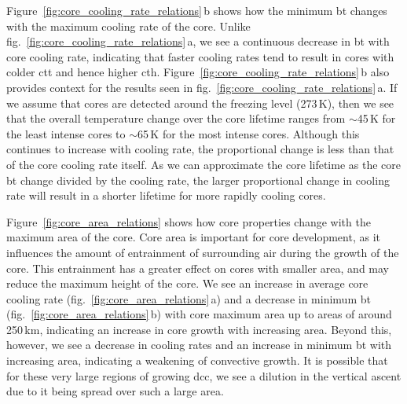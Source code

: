Figure~\ref{fig:core_cooling_rate_relations}\,b shows how the minimum \acrshort{bt} changes with the maximum cooling rate of the core.
Unlike fig.~\ref{fig:core_cooling_rate_relations}\,a, we see a continuous decrease in \acrshort{bt} with core cooling rate, indicating that faster cooling rates tend to result in cores with colder \acrshort{ctt} and hence higher \acrshort{cth}.
Figure~\ref{fig:core_cooling_rate_relations}\,b also provides context for the results seen in fig.~\ref{fig:core_cooling_rate_relations}\,a.
If we assume that cores are detected around the freezing level (273\,\unit{K}), then we see that the overall temperature change over the core lifetime ranges from $\sim$45\,\unit{K} for the least intense cores to $\sim$65\,\unit{K} for the most intense cores.
Although this continues to increase with cooling rate, the proportional change is less than that of the core cooling rate itself.
As we can approximate the core lifetime as the core \acrshort{bt} change divided by the cooling rate, the larger proportional change in cooling rate will result in a shorter lifetime for more rapidly cooling cores.


Figure~\ref{fig:core_area_relations} shows how core properties change with the maximum area of the core.
Core area is important for core development, as it influences the amount of entrainment of surrounding air during the growth of the core.
This entrainment has a greater effect on cores with smaller area, and may reduce the maximum height of the core.
We see an increase in average core cooling rate (fig.~\ref{fig:core_area_relations}\,a) and a decrease in minimum \acrshort{bt} (fig.~\ref{fig:core_area_relations}\,b) with core maximum area up to areas of around 250\,\unit{km}, indicating an increase in core growth with increasing area.
Beyond this, however, we see a decrease in cooling rates and an increase in minimum \acrshort{bt} with increasing area, indicating a weakening of convective growth.
It is possible that for these very large regions of growing \acrshort{dcc}, we see a dilution in the vertical ascent due to it being spread over such a large area.

